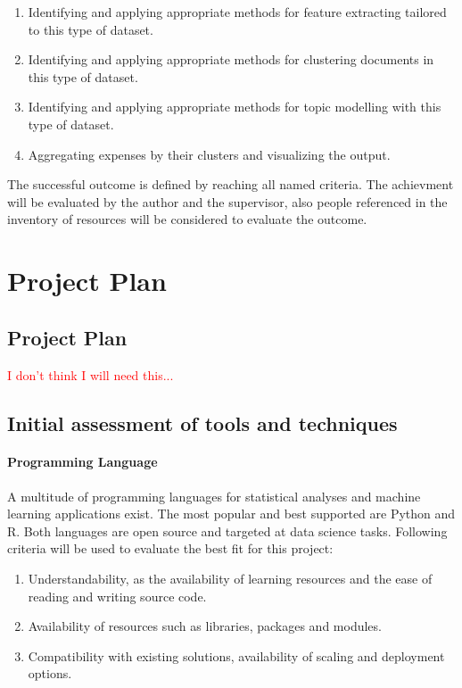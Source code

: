 \begin{enumerate}
\item Identifying and applying appropriate methods for feature extracting tailored to this type of dataset.
\item Identifying and applying appropriate methods for clustering documents in this type of dataset.
\item Identifying and applying appropriate methods for topic modelling with this type of dataset.
\item Aggregating expenses by their clusters and visualizing the output.
\end{enumerate}

The successful outcome is defined by reaching all named criteria. The achievment will be evaluated by the author and the supervisor, also people referenced in the inventory of resources will be considered to evaluate the outcome.


\section{Project Plan}

\subsection{Project Plan}
\textcolor{red}{I don't think I will need this...}

\subsection{Initial assessment of tools and techniques}

\paragraph{Programming Language}
A multitude of programming languages for statistical analyses and machine learning applications exist. The most popular and best supported are Python and R. Both languages are open source and targeted at data science tasks.
Following criteria will be used to evaluate the best fit for this project:
\begin{enumerate}
\item Understandability, as the availability of learning resources and the ease of reading and writing source code.
\item Availability of resources such as libraries, packages and modules.
\item Compatibility with existing solutions, availability of scaling and deployment options.
\end{enumerate}

